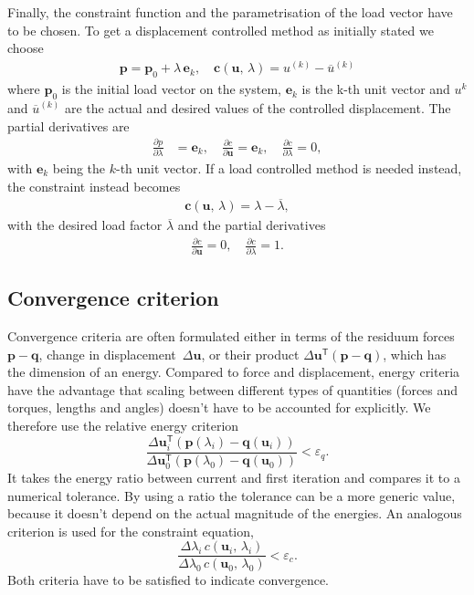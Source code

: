 Finally, the constraint function and the parametrisation of the load vector have to be chosen. To get a displacement controlled method as initially stated we choose
%
\begin{align}
\boldsymbol{p} = \boldsymbol{p}_{0} + \lambda\,\boldsymbol{e}_k,\quad\boldsymbol{c}(\boldsymbol{u},\,\lambda) = u^{(k)} - \overline{u}^{(k)}
\end{align}
%
where $\boldsymbol{p}_{0}$ is the initial load vector on the system, $\boldsymbol{e}_k$ is the k-th unit vector and $u^k$ and $\overline{u}^{(k)}$ are the actual and desired values of the controlled displacement. The partial derivatives are
%
\begin{align*}
\frac{\partial p}{\partial \lambda} &= \boldsymbol{e}_k,\quad
\frac{\partial c}{\partial \boldsymbol{u}} = \boldsymbol{e}_k,\quad
\frac{\partial c}{\partial \lambda} = 0,
\end{align*}
%
with $\boldsymbol{e}_k$ being the $k$-th unit vector. If a load controlled method is needed instead, the constraint instead becomes
%
\begin{align}
\boldsymbol{c}(\boldsymbol{u},\,\lambda) = \lambda - \overline{\lambda},
\end{align}
%
with the desired load factor $\overline{\lambda}$ and the partial derivatives
%
\begin{align*}
\frac{\partial c}{\partial \boldsymbol{u}} = 0,\quad
\frac{\partial c}{\partial \lambda} = 1.
\end{align*}

\subsection{Convergence criterion}

Convergence criteria are often formulated either in terms of the residuum forces $\boldsymbol{p} - \boldsymbol{q}$, change in displacement~$\Delta\boldsymbol{u}$, or their product $\Delta\boldsymbol{u}^\mathsf{T}(\boldsymbol{p}-\boldsymbol{q})$, which has the dimension of an energy. Compared to force and displacement, energy criteria have the advantage that scaling between different types of quantities (forces and torques, lengths and angles) doesn't have to be accounted for explicitly. We therefore use the relative energy criterion
%
\begin{equation*}
\frac{\Delta\boldsymbol{u}_{i}^\mathsf{T}(\boldsymbol{p}(\lambda_i)-\boldsymbol{q}(\boldsymbol{u}_i))}{\Delta\boldsymbol{u}_{0}^\mathsf{T}(\boldsymbol{p}(\lambda_0)-\boldsymbol{q}(\boldsymbol{u}_0))} < \varepsilon_q.
\end{equation*}
%
It takes the energy ratio between current and first iteration and compares it to a numerical tolerance. By using a ratio the tolerance can be a more generic value, because it doesn't depend on the actual magnitude of the energies. An analogous criterion is used for the constraint equation,
%
\begin{equation*}
\frac{\Delta\lambda_{i}\,c(\boldsymbol{u}_{i},\,\lambda_i)}{\Delta\lambda_{0}\,c(\boldsymbol{u}_{0},\,\lambda_0)} < \varepsilon_c.
\end{equation*}
%
Both criteria have to be satisfied to indicate convergence.

